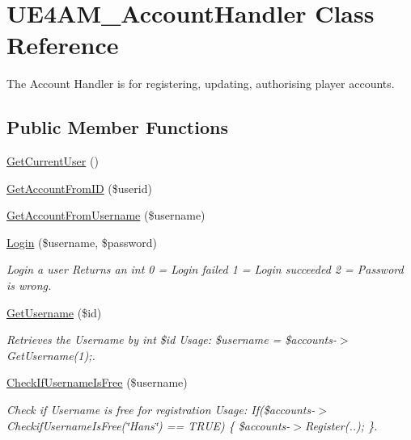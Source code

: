 \hypertarget{class_u_e4_a_m___account_handler}{\section{U\-E4\-A\-M\-\_\-\-Account\-Handler Class Reference}
\label{class_u_e4_a_m___account_handler}
}


The Account Handler is for registering, updating, authorising player accounts.  


\subsection*{Public Member Functions}
\begin{DoxyCompactItemize}
\item 
\hyperlink{class_u_e4_a_m___account_handler_a482eedda3e26e4255ef3a1e01bb98c3e}{Get\-Current\-User} ()
\item 
\hyperlink{class_u_e4_a_m___account_handler_afabbe52886a971b5eca71ac1be54f258}{Get\-Account\-From\-I\-D} (\$userid)
\item 
\hyperlink{class_u_e4_a_m___account_handler_a8b7a8fde6cba7d4019406623cb2ed5cd}{Get\-Account\-From\-Username} (\$username)
\item 
\hyperlink{class_u_e4_a_m___account_handler_a4a533e4b69f7790e6b74bff620275edc}{Login} (\$username, \$password)
\begin{DoxyCompactList}\small\item\em Login a user Returns an int 0 = Login failed 1 = Login succeeded 2 = Password is wrong. \end{DoxyCompactList}\item 
\hyperlink{class_u_e4_a_m___account_handler_a07f33f08153c4014c9e51225db2943c4}{Get\-Username} (\$id)
\begin{DoxyCompactList}\small\item\em Retrieves the Username by int \$id Usage\-: \$username = \$accounts-\/$>$Get\-Username(1);. \end{DoxyCompactList}\item 
\hyperlink{class_u_e4_a_m___account_handler_a7f82701030149995176babfd2741d724}{Check\-If\-Username\-Is\-Free} (\$username)
\begin{DoxyCompactList}\small\item\em Check if Username is free for registration Usage\-: If(\$accounts-\/$>$Checkif\-Username\-Is\-Free(\char`\"{}\-Hans\char`\"{}) == T\-R\-U\-E) \{ \$accounts-\/$>$Register(..); \}. \end{DoxyCompactList}\item 

\end{DoxyCompactItemize}
